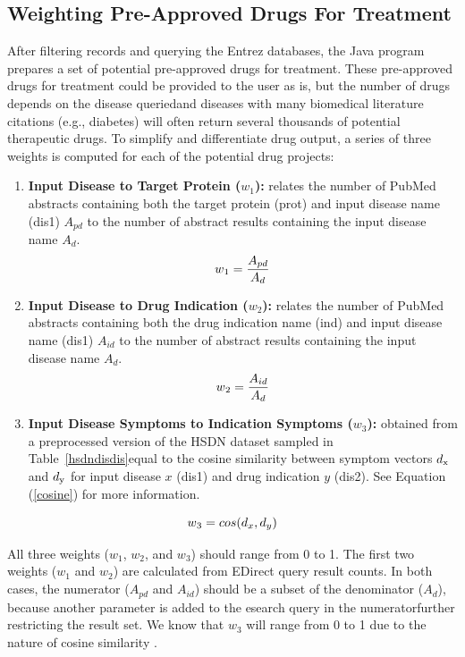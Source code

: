 \documentclass{IEEEtran}
\begin{document}
	\subsection{Weighting Pre-Approved Drugs For Treatment} \label{weights}
	After filtering records and querying the Entrez databases, the Java program prepares a set of potential pre-approved drugs for treatment.  These pre-approved drugs for treatment could be provided to the user as is, but the number of drugs depends on the disease queried\textemdash and diseases with many biomedical literature citations (e.g., diabetes) will often return several thousands of potential therapeutic drugs.  To simplify and differentiate drug output, a series of three weights is computed for each of the potential drug projects:
	\begin{enumerate}
		\item \textbf{Input Disease to Target Protein ($w_1$):}  relates the number of PubMed abstracts containing both the target protein (prot) and input disease name (dis1) $A_{pd}$ to the number of abstract results containing the input disease name $A_{d}$.
		\begin{equation}
		\label{weight1}
		w\textsubscript{1} = \frac{A_{pd}}{A_{d}} 
		\end{equation}
		\item \textbf{Input Disease to Drug Indication ($w_2$):} relates the number of PubMed abstracts containing both the drug indication name (ind) and input disease name (dis1) $A_{id}$ to the number of abstract results containing the input disease name $A_{d}$.
		\begin{equation}
		\label{weight2}
		w\textsubscript{2} = \frac{A_{id}}{A_{d}} 
		\end{equation}
		\item \textbf{Input Disease Symptoms to Indication Symptoms ($w_3$):} obtained from a preprocessed version of the HSDN dataset sampled in Table~\ref{hsdndisdis}\textemdash equal to the cosine similarity between symptom vectors $d\textsubscript{x}$ and $d\textsubscript{y}$ for input disease $x$ (dis1) and drug indication $y$ (dis2).  See Equation (\ref{cosine}) for more information.
	\end{enumerate}  
	\begin{equation}
	\label{weight3}
	w\textsubscript{3} = cos(d_{x},d_{y})
	\end{equation}
	
	All three weights ($w_{1}$, $w_{2}$, and $w_{3}$) should range from 0 to 1.  The first two weights ($w_{1}$ and $w_{2}$) are calculated from EDirect query result counts.  In both cases, the numerator ($A_{pd}$ and $A_{id}$) should be a subset of the denominator ($A_{d}$), because another parameter is added to the esearch query in the numerator\textemdash further restricting the result set.  We know that $w_{3}$ will range from 0 to 1 due to the nature of cosine similarity \cite{hsdn}.  
	
\end{document}
